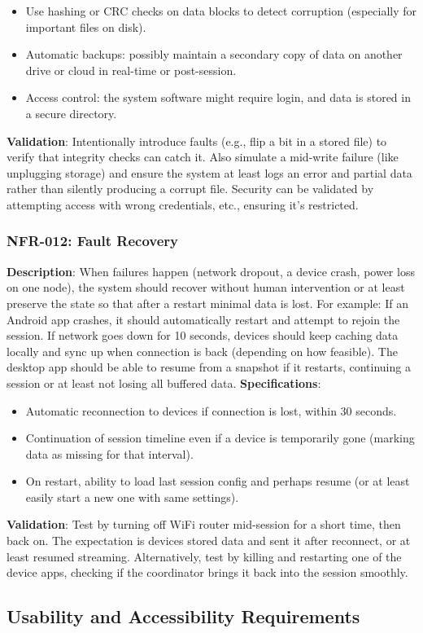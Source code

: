 \documentclass[11pt,a4paper]{report}
\begin{document}
\begin{itemize}
\item Use hashing or CRC checks on data blocks to detect corruption (especially for important files on disk).
\item Automatic backups: possibly maintain a secondary copy of data on another drive or cloud in real-time or post-session.
\item Access control: the system software might require login, and data is stored in a secure directory.
\end{itemize} \textbf{Validation}: Intentionally introduce faults (e.g., flip a bit in a stored file) to verify that integrity checks can catch it. Also simulate a mid-write failure (like unplugging storage) and ensure the system at least logs an error and partial data rather than silently producing a corrupt file. Security can be validated by attempting access with wrong credentials, etc., ensuring it's restricted. \subsubsection*{NFR-012: Fault Recovery}
\textbf{Description}: When failures happen (network dropout, a device crash, power loss on one node), the system should recover without human intervention or at least preserve the state so that after a restart minimal data is lost. For example:
If an Android app crashes, it should automatically restart and attempt to rejoin the session.
If network goes down for 10 seconds, devices should keep caching data locally and sync up when connection is back (depending on how feasible).
The desktop app should be able to resume from a snapshot if it restarts, continuing a session or at least not losing all buffered data.
\textbf{Specifications}:
\begin{itemize}
\item Automatic reconnection to devices if connection is lost, within 30 seconds.
\item Continuation of session timeline even if a device is temporarily gone (marking data as missing for that interval).
\item On restart, ability to load last session config and perhaps resume (or at least easily start a new one with same settings).
\end{itemize} \textbf{Validation}: Test by turning off WiFi router mid-session for a short time, then back on. The expectation is devices stored data and sent it after reconnect, or at least resumed streaming. Alternatively, test by killing and restarting one of the device apps, checking if the coordinator brings it back into the session smoothly. \subsection{Usability and Accessibility Requirements}
\end{document}
